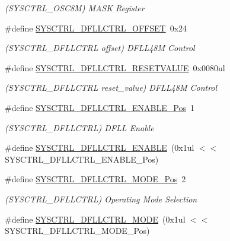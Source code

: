 \begin{DoxyCompactItemize}
\begin{DoxyCompactList}\small\item\em (S\+Y\+S\+C\+T\+R\+L\+\_\+\+O\+S\+C8M) M\+A\+SK Register \end{DoxyCompactList}\item 
\#define \mbox{\hyperlink{group___s_a_m_d21___s_y_s_c_t_r_l_ga0fd6d16a5a25624d01ce2366aea62365}{S\+Y\+S\+C\+T\+R\+L\+\_\+\+D\+F\+L\+L\+C\+T\+R\+L\+\_\+\+O\+F\+F\+S\+ET}}~0x24
\begin{DoxyCompactList}\small\item\em (S\+Y\+S\+C\+T\+R\+L\+\_\+\+D\+F\+L\+L\+C\+T\+RL offset) D\+F\+L\+L48M Control \end{DoxyCompactList}\item 
\#define \mbox{\hyperlink{group___s_a_m_d21___s_y_s_c_t_r_l_gac38e939a0d6a203fbb6b05a851de11ae}{S\+Y\+S\+C\+T\+R\+L\+\_\+\+D\+F\+L\+L\+C\+T\+R\+L\+\_\+\+R\+E\+S\+E\+T\+V\+A\+L\+UE}}~0x0080ul
\begin{DoxyCompactList}\small\item\em (S\+Y\+S\+C\+T\+R\+L\+\_\+\+D\+F\+L\+L\+C\+T\+RL reset\+\_\+value) D\+F\+L\+L48M Control \end{DoxyCompactList}\item 
\#define \mbox{\hyperlink{group___s_a_m_d21___s_y_s_c_t_r_l_ga9d8418733d39416cc656afd863e9ee9a}{S\+Y\+S\+C\+T\+R\+L\+\_\+\+D\+F\+L\+L\+C\+T\+R\+L\+\_\+\+E\+N\+A\+B\+L\+E\+\_\+\+Pos}}~1
\begin{DoxyCompactList}\small\item\em (S\+Y\+S\+C\+T\+R\+L\+\_\+\+D\+F\+L\+L\+C\+T\+RL) D\+F\+LL Enable \end{DoxyCompactList}\item 
\#define \mbox{\hyperlink{group___s_a_m_d21___s_y_s_c_t_r_l_ga4a697051899ed5015a8f2f217461cf16}{S\+Y\+S\+C\+T\+R\+L\+\_\+\+D\+F\+L\+L\+C\+T\+R\+L\+\_\+\+E\+N\+A\+B\+LE}}~(0x1ul $<$$<$ S\+Y\+S\+C\+T\+R\+L\+\_\+\+D\+F\+L\+L\+C\+T\+R\+L\+\_\+\+E\+N\+A\+B\+L\+E\+\_\+\+Pos)
\item 
\#define \mbox{\hyperlink{group___s_a_m_d21___s_y_s_c_t_r_l_gad0d1e2156de44aada755250707670a76}{S\+Y\+S\+C\+T\+R\+L\+\_\+\+D\+F\+L\+L\+C\+T\+R\+L\+\_\+\+M\+O\+D\+E\+\_\+\+Pos}}~2
\begin{DoxyCompactList}\small\item\em (S\+Y\+S\+C\+T\+R\+L\+\_\+\+D\+F\+L\+L\+C\+T\+RL) Operating Mode Selection \end{DoxyCompactList}\item 
\#define \mbox{\hyperlink{group___s_a_m_d21___s_y_s_c_t_r_l_ga4e9064c45e77e946331b58c7ed4d8bd2}{S\+Y\+S\+C\+T\+R\+L\+\_\+\+D\+F\+L\+L\+C\+T\+R\+L\+\_\+\+M\+O\+DE}}~(0x1ul $<$$<$ S\+Y\+S\+C\+T\+R\+L\+\_\+\+D\+F\+L\+L\+C\+T\+R\+L\+\_\+\+M\+O\+D\+E\+\_\+\+Pos)

\end{DoxyCompactItemize}
